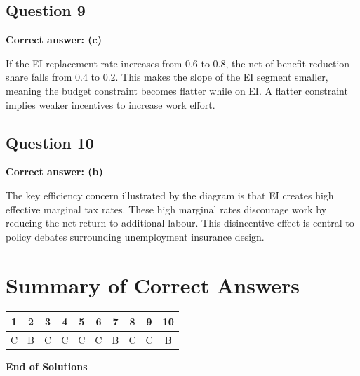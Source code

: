 \documentclass[11pt]{article}
\begin{document}
\subsection*{Question 9}

\textbf{Correct answer: (c)}

If the EI replacement rate increases from 0.6 to 0.8, the net-of-benefit-reduction share falls from 0.4 to 0.2.  
This makes the slope of the EI segment smaller, meaning the budget constraint becomes flatter while on EI.  
A flatter constraint implies weaker incentives to increase work effort.



\subsection*{Question 10}

\textbf{Correct answer: (b)}

The key efficiency concern illustrated by the diagram is that EI creates high effective marginal tax rates.  
These high marginal rates discourage work by reducing the net return to additional labour.  
This disincentive effect is central to policy debates surrounding unemployment insurance design.



\section*{Summary of Correct Answers}

\begin{center}
\begin{tabular}{cccccccccc}
1 & 2 & 3 & 4 & 5 & 6 & 7 & 8 & 9 & 10 \\
\hline
C & B & C & C & C & C & B & C & C & B
\end{tabular}
\end{center}

\vfill
\textbf{End of Solutions}
\end{document}
